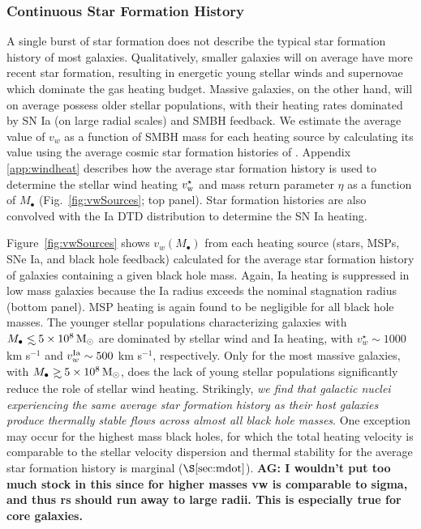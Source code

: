 \documentclass[usenatbib,fleqn]{mn2e}
\newcommand\lsim{\mathrel{\rlap{\lower4pt\hbox{\hskip1pt$\sim$}}
    \raise1pt\hbox{$<$}}}
\newcommand\gsim{\mathrel{\rlap{\lower4pt\hbox{\hskip1pt$\sim$}}
    \raise1pt\hbox{$>$}}}
\newcommand{\Mbh}[1][]{M_{\bullet#1}}
\newcommand{\vwO}{v_{w}}
\begin{document}
\subsubsection{Continuous Star Formation History}
A single burst of star formation does not describe the typical star
formation history of most galaxies.  Qualitatively, smaller galaxies
will on average have more recent star formation, resulting in
energetic young stellar winds and supernovae which dominate the gas
heating budget.  Massive galaxies, on the other hand, will on average
possess older stellar populations, with their heating rates dominated
by SN Ia (on large radial scales) and SMBH feedback.  We estimate the
average value of $\vwO$ as a function of SMBH mass for each heating
source by calculating its value using the average cosmic star
formation histories of \citet{MosterNaab+:2013a}.  Appendix
\ref{app:windheat} describes how the average star formation history is
used to determine the stellar wind heating $v_{\rm w}^{\star}$ and
mass return parameter $\eta$ as a function of $M_{\bullet}$
(Fig.~\ref{fig:vwSources}; top panel).  Star formation histories are also
convolved with the Ia DTD distribution to determine the SN Ia heating.

Figure~\ref{fig:vwSources} shows $\vwO(M_{\bullet})$ from each heating
source (stars, MSPs, SNe Ia, and black hole feedback) calculated for
the average star formation history of galaxies containing a given
black hole mass.  Again, Ia heating is suppressed in low mass galaxies
because the Ia radius exceeds the nominal stagnation radius (bottom
panel).  MSP heating is again found to be negligible for all black
hole masses.  The younger stellar populations characterizing galaxies
with $\Mbh\lsim 5\times 10^{8} \Msun$ are dominated by stellar wind
and Ia heating, with $v_{w}^{\star} \sim 1000$ km s$^{-1}$ and
$v_w^{\rm Ia} \sim 500$ km s$^{-1}$, respectively.  Only for the most
massive galaxies, with $\Mbh\gsim 5\times 10^{8} \Msun$, does the lack
of young stellar populations significantly reduce the role of stellar
wind
heating.  %
Strikingly, {\it we find that galactic nuclei experiencing the same
  average star formation history as their host galaxies produce
  thermally stable flows across almost all black hole masses}.  One exception may occur for the highest mass black holes, for which the total heating velocity is comparable to the stellar velocity dispersion and thermal stability for the average star formation history is marginal ($\S\ref{sec:mdot}$).
{\bf AG: I wouldn't put too much stock in this since for higher masses
vw is comparable to sigma, and thus rs should run away to large
radii. This is especially true for core galaxies.}
\end{document}
